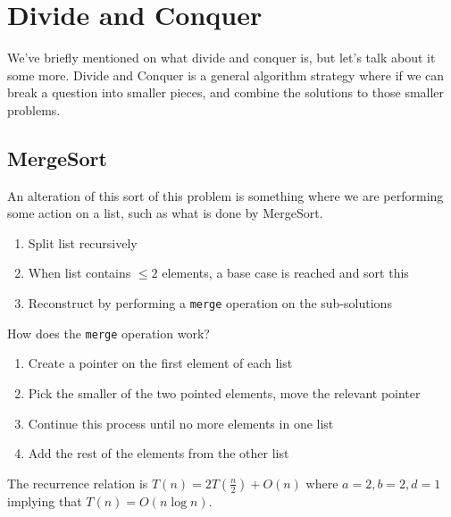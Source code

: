 \documentclass[14pt]{extarticle}
\begin{document}
    \section{Divide and Conquer}
    We've briefly mentioned on what divide and conquer is, but let's talk about
    it some more. Divide and Conquer is a general algorithm strategy where if
    we can break a question into smaller pieces, and combine the solutions
    to those smaller problems.

    \subsection{MergeSort}
    An alteration of this sort of this problem is something where we are 
    performing some action on a list, such as what is done by MergeSort.
    \begin{enumerate}
        \item Split list recursively
        \item When list contains $\leq 2$ elements, a base case is reached
                and sort this
        \item Reconstruct by performing a \texttt{merge} operation on the
            sub-solutions
    \end{enumerate}

    How does the \texttt{merge} operation work? 
    \begin{enumerate}
        \item Create a pointer on the first element of each list
        \item Pick the smaller of the two pointed elements, move the relevant
            pointer
        \item Continue this process until no more elements in one list
        \item Add the rest of the elements from the other list
    \end{enumerate}

    The recurrence relation is $T(n) = 2T\left(\frac{n}{2}\right) + O(n)$
    where $a = 2, b = 2, d = 1$ implying that $T(n) = O(n\log n)$.\\
\end{document}
